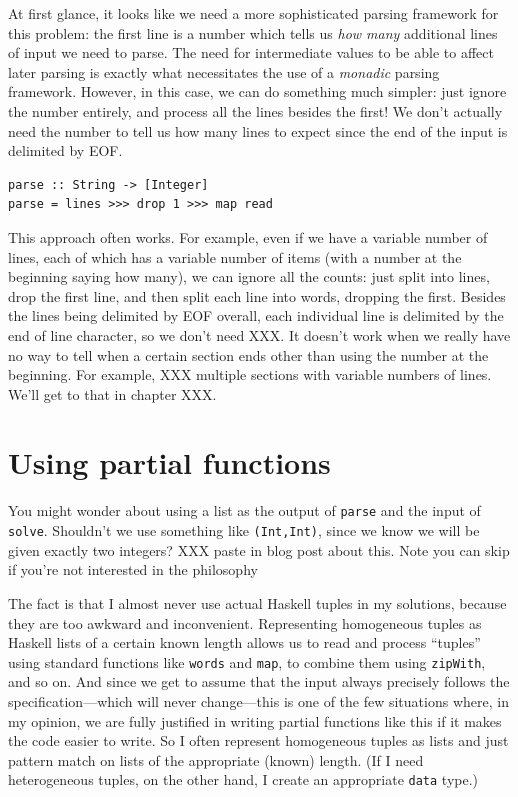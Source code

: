 \documentclass{book}
\newcommand{\h}[1]{\texttt{#1}}
\begin{document}
At first glance, it looks like we need a more sophisticated parsing
framework for this problem: the first line is a number which tells us
\emph{how many} additional lines of input we need to parse.  The need
for intermediate values to be able to affect later parsing is exactly
what necessitates the use of a \emph{monadic} parsing framework.
However, in this case, we can do something much simpler: just ignore
the number entirely, and process all the lines besides the first!  We
don't actually need the number to tell us how many lines to expect
since the end of the input is delimited by EOF.

\begin{verbatim}
parse :: String -> [Integer]
parse = lines >>> drop 1 >>> map read
\end{verbatim}

This approach often works. For example, even if we have a variable
number of lines, each of which has a variable number of items (with a
number at the beginning saying how many), we can ignore all the
counts: just split into lines, drop the first line, and then split
each line into words, dropping the first.  Besides the lines being
delimited by EOF overall, each individual line is delimited by the end
of line character, so we don't need XXX.  It doesn't work when we
really have no way to tell when a certain section ends other than
using the number at the beginning. For example, XXX multiple sections
with variable numbers of lines.  We'll get to that in chapter XXX.

\section{Using partial functions}
\label{sec:partial}

You might wonder about using a list as the output of \h{parse} and the
input of \h{solve}.  Shouldn't we use something like \h{(Int,Int)}, since
we know we will be given exactly two integers? XXX paste in blog post
about this.  Note you can skip if you're not interested in the
philosophy

  The fact is that I almost never use actual Haskell tuples in my
  solutions, because they are too awkward and
  inconvenient. Representing homogeneous tuples as Haskell lists of a
  certain known length allows us to read and process ``tuples'' using
  standard functions like \h{words} and \h{map}, to combine them using
  \h{zipWith}, and so on.  And since we get to assume that the input
  always precisely follows the specification---which will never
  change---this is one of the few situations where, in my opinion, we
  are fully justified in writing partial functions like this if it
  makes the code easier to write.  So I often represent homogeneous
  tuples as lists and just pattern match on lists of the appropriate
  (known) length.  (If I need heterogeneous tuples, on the other hand,
  I create an appropriate \h{data} type.)
\end{document}
